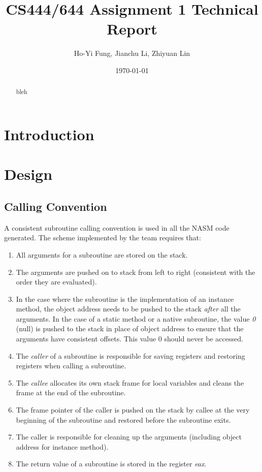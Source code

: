\documentclass[a4paper, notitlepage]{report}
\title{CS444/644 Assignment 1 Technical Report}
\author{Ho-Yi Fung, Jianchu Li, Zhiyuan Lin}
\date{\today}
\begin{document}
{\let\newpage\relax\maketitle}

\vspace{30pt}
\begin{abstract}
bleh
\end{abstract}


\tableofcontents

\newpage

\chapter{Introduction}



\chapter{Design}
\label{design}

\section{Calling Convention}

A consistent subroutine calling convention is used in all the NASM code generated. The scheme implemented by the team requires that:
\begin{enumerate}
\item All arguments for a subroutine are stored on the stack.
\item The arguments are pushed on to stack from left to right (consistent with the order they are evaluated).
\item In the case where the subroutine is the implementation of an instance method, the object address needs to be pushed to the stack \emph{after} all the arguments. In the case of a static method or a native subroutine, the value \emph{0} (null) is pushed to the stack in place of object address to ensure that the arguments have consistent offsets. This value 0 should never be accessed.
\item The \emph{caller} of a subroutine is responsible for saving registers and restoring registers when calling a subroutine.
\item The \emph{callee} allocates its own stack frame for local variables and cleans the frame at the end of the subroutine.
\item The frame pointer of the caller is pushed on the stack by callee at the very beginning of the subroutine and restored before the subroutine exits. 
\item The caller is responsible for cleaning up the arguments (including object address for instance method).
\item The return value of a subroutine is stored in the register \emph{eax}.
\end{enumerate}
\end{document}
